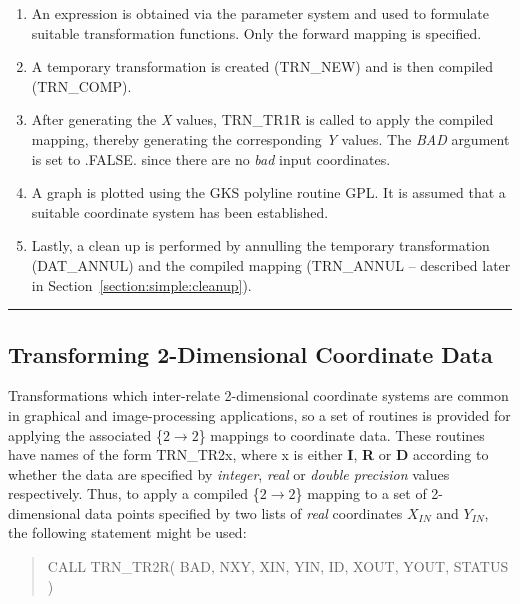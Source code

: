 \documentclass[twoside,nolof,11pt]{starlink}
\providecommand{\name}[1]{\small{#1}}
\providecommand{\fortvar}[1]{\emph{#1}}
\providecommand{\exampledone}[0]{\begin{center} \rule{6em}{0.2mm} \end{center}}
\begin{document}
\begin{enumerate}

\item An expression is obtained via the parameter system and used to
formulate suitable transformation functions.
Only the forward mapping is specified.

\item A temporary transformation is created (\name{TRN\_NEW}) and is then
compiled (\name{TRN\_COMP}).

\item After generating the \fortvar{X} values, \name{TRN\_TR1R} is called to
apply the compiled mapping, thereby generating the corresponding \fortvar{Y}
values.
The \fortvar{BAD} argument is set to \name{.FALSE.} since there are no \emph{bad} input coordinates.

\item A graph is plotted using the \name{GKS} polyline routine \name{GPL}.
It is assumed that a suitable coordinate system has been established.

\item Lastly, a clean up is performed by annulling the temporary
transformation (\name{DAT\_ANNUL}) and the compiled mapping
(\name{TRN\_ANNUL} -- described later in
Section~\ref{section:simple:cleanup}).

\end{enumerate}
\exampledone


\subsection{Transforming 2-Dimensional Coordinate Data}

\label{section:simple:2ddata}

Transformations which inter-relate 2-dimensional coordinate systems are
common in graphical and image-processing applications, so a set of routines
is provided for applying the associated \mbox{\{$2 \rightarrow 2$\}}
mappings to coordinate data.
These routines have names of the form \name{TRN\_TR2x}, where x is either
\textbf{I}, \textbf{R} or \textbf{D} according to whether the data are
specified by
\emph{integer}, \emph{real} or \emph{double precision} values respectively.
Thus, to apply a compiled \mbox{\{$2 \rightarrow 2$\}} mapping to a set of
2-dimensional data points specified by two lists of \emph{real} coordinates
$X_{IN}$ and $Y_{IN}$, the following statement might be used:

\begin{quote}
\begin{terminalv}
CALL TRN_TR2R( BAD, NXY, XIN, YIN, ID, XOUT, YOUT, STATUS )
\end{terminalv}
\end{quote}
\end{document}

